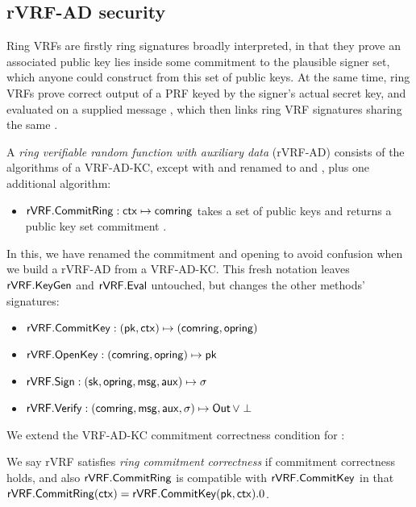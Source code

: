 
\subsection{rVRF-AD security}
\label{sec:rvrf_def}

Ring VRFs are firstly ring signatures broadly interpreted, in that they
prove an associated public key lies inside some commitment \comring to
the plausible signer set,
 which anyone could construct from this set of public keys.
At the same time, ring VRFs prove correct output of a PRF keyed by
the signer's actual secret key, and evaluated on a supplied message \msg,
 which then links ring VRF signatures sharing the same \msg.

A {\em ring verifiable random function with auxiliary data} (rVRF-AD)
consists of the algorithms of a VRF-AD-KC, except with
 \compk and \openpk renamed to \comring and \openring,
 plus one additional algorithm:
\begin{itemize}
\item ${\mathsf{rVRF}}.{\mathsf{CommitRing}} : \mathsf{ctx} \mapsto \mathsf{comring}$ takes a set \ctx of
 public keys and returns a public key set commitment \comring.
\end{itemize}

\def\rSign{\Sign}
\def\rVerify{\Verify}

In this, we have renamed the commitment and opening to avoid confusion
when we build a rVRF-AD from a VRF-AD-KC.  This fresh notation leaves
${\mathsf{rVRF}}.{\mathsf{KeyGen}}$ and ${\mathsf{rVRF}}.{\mathsf{Eval}}$ untouched, but
 changes the other methods' signatures:
\begin{itemize}
\item ${\mathsf{rVRF}}.{\mathsf{CommitKey}} : (\mathsf{pk},\mathsf{ctx}) \mapsto (\mathsf{comring},\mathsf{opring})$
\item ${\mathsf{rVRF}}.{\mathsf{OpenKey}} : (\mathsf{comring},\mathsf{opring}) \mapsto \mathsf{pk}$
\item $\rVRF.\rSign : (\sk,\openring,\msg,\aux) \mapsto \sigma$
\item $\rVRF.\rVerify : (\comring,\msg,\aux,\sigma) \mapsto \Out \, \lor \perp$
\end{itemize}

We extend the VRF-AD-KC commitment correctness condition for \CommitRing:

\begin{definition}
We say rVRF satisfies {\em ring commitment correctness} if
commitment correctness holds, and also ${\mathsf{rVRF}}.{\mathsf{CommitRing}}$ is 
 compatible with ${\mathsf{rVRF}}.{\mathsf{CommitKey}}$ in that
  ${\mathsf{rVRF}}.{\mathsf{CommitRing}}(\mathsf{ctx}) = {\mathsf{rVRF}}.{\mathsf{CommitKey}}(\mathsf{pk},\mathsf{ctx}).0$.
\end{definition}

